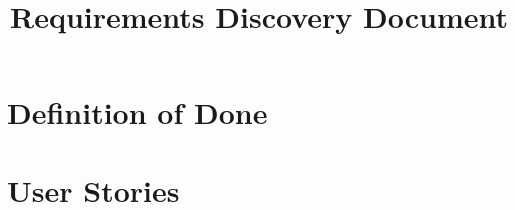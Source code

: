 \documentclass{book}
\title{\ProjectName{} \\ Requirements Discovery Document}
\author{\DocumentAuthor}
\date{\vhCurrentDate}
\begin{document}
\maketitle

\frontmatter



\cleardoublepage{}
\tableofcontents

\mainmatter{}
\part{Definition of Done}\label{part:dod}



\part{User Stories}\label{part:stories}



\cleardoublepage{}
\printindex

\cleardoublepage{}
\end{document}
